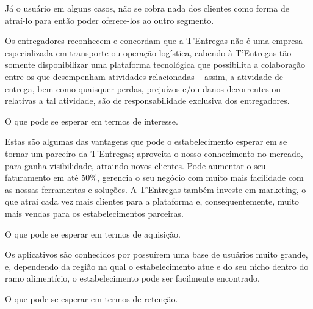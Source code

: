 Já o usuário em alguns casos, não se cobra nada dos clientes como forma de atraí-lo para então poder oferece-los ao outro segmento.\par

Os entregadores reconhecem e concordam que a T'Entregas não é uma empresa especializada em transporte ou operação logística, cabendo à T'Entregas tão somente disponibilizar uma plataforma tecnológica que possibilita a colaboração entre os que desempenham atividades relacionadas – assim, a atividade de entrega, bem como quaisquer perdas, prejuízos e/ou danos decorrentes ou relativas a tal atividade, são de responsabilidade exclusiva dos entregadores.\par


\begin{commentA} \vspace{0.3cm} \noindent O que pode se esperar em termos de interesse. \par \vspace{0.1cm} \end{commentA}


Estas são algumas das vantagens que pode o estabelecimento esperar em se tornar um parceiro da T'Entregas; aproveita o nosso conhecimento no mercado, para ganha visibilidade, atraindo novos clientes. Pode aumentar o seu faturamento em até 50\%, gerencia o seu negócio com muito mais facilidade com as nossas ferramentas e soluções. A T'Entregas também investe em marketing, o que atrai cada vez mais clientes para a plataforma e, consequentemente, muito mais vendas para os estabelecimentos parceiras.\par


\begin{commentA} \vspace{0.3cm} \noindent O que pode se esperar em termos de aquisição. \par \vspace{0.1cm} \end{commentA}


Os aplicativos são conhecidos por possuírem uma base de usuários muito grande, e, dependendo da região na qual o estabelecimento atue e do seu nicho dentro do ramo alimentício, o estabelecimento pode ser facilmente encontrado.\par


\begin{commentA} \vspace{0.3cm} \noindent O que pode se esperar em termos de retenção. \par \vspace{0.1cm} \end{commentA}


